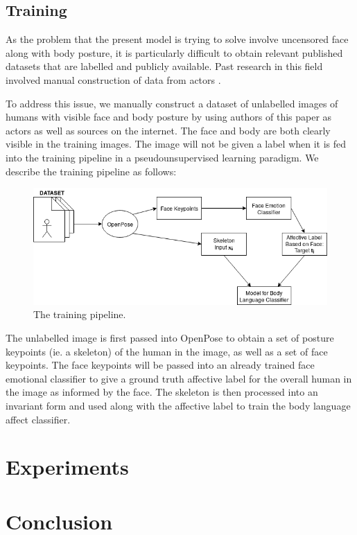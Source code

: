\documentclass{article}
\begin{document}
\subsection{Training}
As the problem that the present model is trying to solve involve uncensored face along with body posture, it is particularly difficult to obtain relevant published datasets that are labelled and publicly available. Past research in this field involved manual construction of data from actors \citep{schindler2008recognizing}.

To address this issue, we manually construct a dataset of unlabelled images of humans with visible face and body posture by using authors of this paper as actors as well as sources on the internet. The face and body are both clearly visible in the training images. The image will not be given a label when it is fed into the training pipeline in a pseudounsupervised learning paradigm. We describe the training pipeline as follows:

\begin{figure}[h]
	\centering
	\includegraphics[scale=0.6]{tpipeline}
	\caption{The training pipeline.}
\end{figure}

The unlabelled image is first passed into OpenPose to obtain a set of posture keypoints (ie. a skeleton) of the human in the image, as well as a set of face keypoints. The face keypoints will be passed into an already trained face emotional classifier to give a ground truth affective label for the overall human in the image as informed by the face. The skeleton is then processed into an invariant form and used along with the affective label to train the body language affect classifier.

\section{Experiments}

\section{Conclusion}
\end{document}
